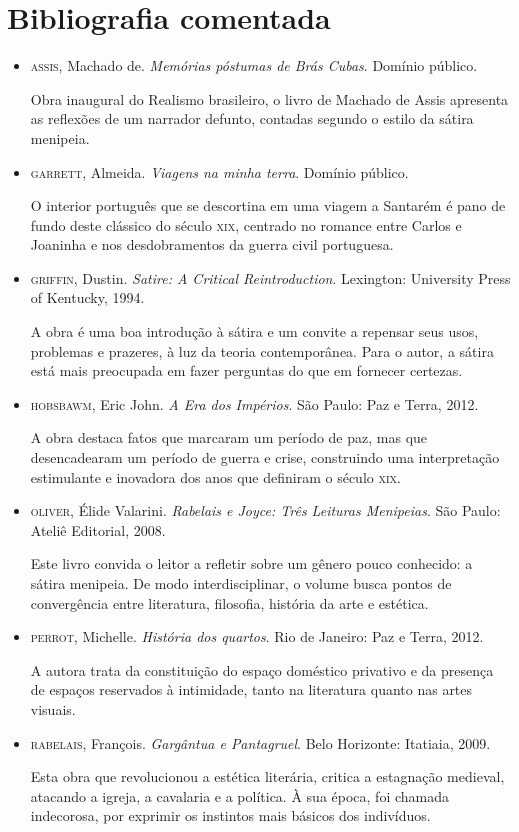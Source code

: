 \documentclass[12pt]{extarticle}
\begin{document}
\section{Bibliografia comentada}

\begin{itemize}


\item\textsc{assis}, Machado de. \textit{Memórias póstumas de Brás Cubas}. Domínio
público.

Obra inaugural do Realismo brasileiro, o livro de Machado de Assis
apresenta as reflexões de um narrador defunto, contadas segundo o estilo
da sátira menipeia.

\item\textsc{garrett}, Almeida. \textit{Viagens na minha terra}. Domínio público.

O interior português que se descortina em uma viagem a Santarém é pano
de fundo deste clássico do século \textsc{xix}, centrado no romance entre Carlos
e Joaninha e nos desdobramentos da guerra civil portuguesa.


\item\textsc{griffin}, Dustin. \textit{Satire: A Critical Reintroduction}. Lexington:
University Press of Kentucky, 1994.

A obra é uma boa introdução à sátira e um convite a repensar seus usos,
problemas e prazeres, à luz da teoria contemporânea. Para o autor, a
sátira está mais preocupada em fazer perguntas do que em fornecer
certezas.

\item\textsc{hobsbawm}, Eric John. \textit{A Era dos Impérios}. São Paulo: Paz e Terra, 2012.

A obra destaca fatos que marcaram um período de paz, mas que
desencadearam um período de guerra e crise, construindo uma
interpretação estimulante e inovadora dos anos que definiram o século
\textsc{xix}.

\item\textsc{oliver}, Élide Valarini. \textit{Rabelais e Joyce: Três Leituras
Menipeias}. São Paulo: Ateliê Editorial, 2008.

Este livro convida o leitor a refletir sobre um gênero pouco conhecido:
a sátira menipeia. De modo interdisciplinar, o volume busca pontos de
convergência entre literatura, filosofia, história da arte e estética.

\item\textsc{perrot}, Michelle. \textit{História dos quartos}. Rio de Janeiro: Paz e
Terra, 2012.

A autora trata da constituição do espaço doméstico privativo e da
presença de espaços reservados à intimidade, tanto na literatura quanto
nas artes visuais.

\item\textsc{rabelais}, François. \textit{Gargântua e Pantagruel}. Belo Horizonte:
Itatiaia, 2009.

Esta obra que revolucionou a estética literária, critica a estagnação
medieval, atacando a igreja, a cavalaria e a política. À sua época, foi
chamada indecorosa, por exprimir os instintos mais básicos dos
indivíduos.

\end{itemize}
\end{document}
